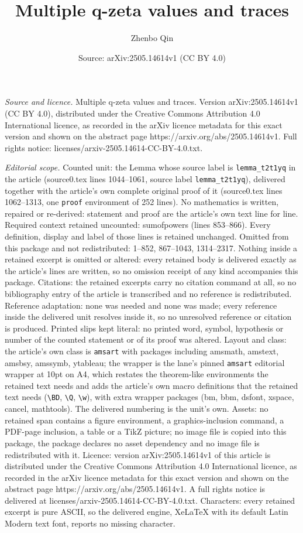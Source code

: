\documentclass[10pt,a4paper]{amsart}
\title[Multiple q-zeta values and traces]{Multiple q-zeta values and traces}
\author{Zhenbo Qin}
\date{Source: arXiv:2505.14614v1 (CC BY 4.0)}
\begin{document}
\maketitle

\noindent\emph{Source and licence.} Multiple q-zeta values and traces. Version arXiv:2505.14614v1 (CC BY 4.0), distributed under the Creative Commons Attribution 4.0 International licence, as recorded in the arXiv licence metadata for this exact version and shown on the abstract page https://arxiv.org/abs/2505.14614v1. Full rights notice: licenses/arxiv-2505.14614-CC-BY-4.0.txt.\par\smallskip

\noindent\textit{Editorial scope.} Counted unit: the Lemma whose source label is \texttt{lemma\_t2t1yq} in the article (source0.tex lines 1044--1061, source label \texttt{lemma\_t2t1yq}), delivered together with the article's own complete original proof of it (source0.tex lines 1062--1313, one \texttt{proof} environment of 252 lines). No mathematics is written, repaired or re-derived: statement and proof are the article's own text line for line. Required context retained uncounted: sumofpowers (lines 853--866). Every definition, display and label of those lines is retained unchanged. Omitted from this package and not redistributed: 1--852, 867--1043, 1314--2317. Nothing inside a retained excerpt is omitted or altered: every retained body is delivered exactly as the article's lines are written, so no omission receipt of any kind accompanies this package. Citations: the retained excerpts carry no citation command at all, so no bibliography entry of the article is transcribed and no reference is redistributed. Reference adaptation: none was needed and none was made; every reference inside the delivered unit resolves inside it, so no unresolved reference or citation is produced. Printed slips kept literal: no printed word, symbol, hypothesis or number of the counted statement or of its proof was altered. Layout and class: the article's own class is \texttt{amsart} with packages including amsmath, amstext, amsbsy, amssymb, ytableau; the wrapper is the lane's pinned \texttt{amsart} editorial wrapper at 10pt on A4, which restates the theorem-like environments the retained text needs and adds the article's own macro definitions that the retained text needs (\texttt{\textbackslash BD}, \texttt{\textbackslash Q}, \texttt{\textbackslash w}), with extra wrapper packages (bm, bbm, dsfont, xspace, cancel, mathtools). The delivered numbering is the unit's own. Assets: no retained span contains a figure environment, a graphics-inclusion command, a PDF-page inclusion, a table or a TikZ picture; no image file is copied into this package, the package declares no asset dependency and no image file is redistributed with it. Licence: version arXiv:2505.14614v1 of this article is distributed under the Creative Commons Attribution 4.0 International licence, as recorded in the arXiv licence metadata for this exact version and shown on the abstract page https://arxiv.org/abs/2505.14614v1. A full rights notice is delivered at licenses/arxiv-2505.14614-CC-BY-4.0.txt. Characters: every retained excerpt is pure ASCII, so the delivered engine, XeLaTeX with its default Latin Modern text font, reports no missing character.
\end{document}

